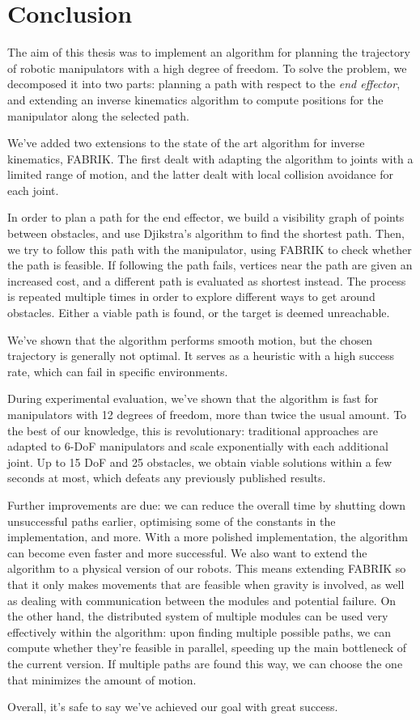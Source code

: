 \chapter{Conclusion}

The aim of this thesis was to implement an algorithm for planning the trajectory of robotic manipulators with a high degree of freedom. To solve the problem, we decomposed it into two parts: planning a path with respect to the \textit{end effector}, and extending an inverse kinematics algorithm to compute positions for the manipulator along the selected path.

We've added two extensions to the state of the art algorithm for inverse kinematics, FABRIK. The first dealt with adapting the algorithm to joints with a limited range of motion, and the latter dealt with local collision avoidance for each joint.

In order to plan a path for the end effector, we build a visibility graph of points between obstacles, and use Djikstra's algorithm to find the shortest path. Then, we try to follow this path with the manipulator, using FABRIK to check whether the path is feasible. If following the path fails, vertices near the path are given an increased cost, and a different path is evaluated as shortest instead. The process is repeated multiple times in order to explore different ways to get around obstacles. Either a viable path is found, or the target is deemed unreachable.

We've shown that the algorithm performs smooth motion, but the chosen trajectory is generally not optimal. It serves as a heuristic with a high success rate, which can fail in specific environments.

During experimental evaluation, we've shown that the algorithm is fast for manipulators with 12 degrees of freedom, more than twice the usual amount. To the best of our knowledge, this is revolutionary: traditional approaches are adapted to 6-DoF manipulators and scale exponentially with each additional joint. Up to 15 DoF and 25 obstacles, we obtain viable solutions within a few seconds at most, which defeats any previously published results.

Further improvements are due: we can reduce the overall time by shutting down unsuccessful paths earlier, optimising some of the constants in the implementation, and more. With a more polished implementation, the algorithm can become even faster and more successful. We also want to extend the algorithm to a physical version of our robots. This means extending FABRIK so that it only makes movements that are feasible when gravity is involved, as well as dealing with communication between the modules and potential failure. On the other hand, the distributed system of multiple modules can be used very effectively within the algorithm: upon finding multiple possible paths, we can compute whether they're feasible in parallel, speeding up the main bottleneck of the current version. If multiple paths are found this way, we can choose the one that minimizes the amount of motion.

Overall, it's safe to say we've achieved our goal with great success.

